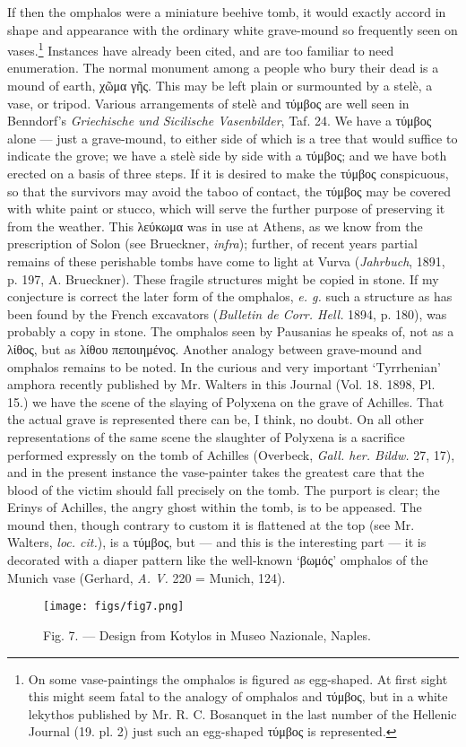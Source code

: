 \documentclass[a4paper, 11pt, oneside, polutonikogreek, english]{article}
\begin{document}
If then the omphalos were a miniature beehive tomb, it would exactly accord in shape and appearance with the ordinary white grave-mound so frequently seen on vases.\footnote{On some vase-paintings the omphalos is figured as egg-shaped. At first sight this might seem fatal to the analogy of omphalos and τύμβος, but in a white lekythos published by Mr. R. C. Bosanquet in the last number of the Hellenic Journal (19. pl. 2) just such an egg-shaped τύμβος is represented.} Instances have already been cited, and are too familiar to need enumeration. The normal monument among a people who bury their dead is a mound of earth, χῶμα γῆς. This may be left plain or surmounted by a stelè, a vase, or tripod. Various arrangements of stelè and τύμβος are well seen in Benndorf's \emph{Griechische und Sicilische Vasenbilder}, Taf. 24. We have a τύμβος alone --- just a grave-mound, to either side of which is a tree that would suffice to indicate the grove; we have a stelè side by side with a τύμβος; and we have both erected on a basis of three steps. If it is desired to make the τύμβος conspicuous, so that the survivors may avoid the taboo of contact, the τύμβος may be covered with white paint or stucco, which will serve the further purpose of preserving it from the weather. This λεύκωμα was in use at Athens, as we know from the prescription of Solon (see Brueckner, \emph{infra}); further, of recent years partial remains of these perishable tombs have come to light at Vurva (\emph{Jahrbuch}, 1891, p. 197, A. Brueckner). These fragile structures might be copied in stone. If my conjecture is correct the later form of the omphalos, \emph{e. g.} such a structure as has been found by the French excavators (\emph{Bulletin de Corr. Hell.} 1894, p. 180), was probably a copy in stone. The omphalos seen by Pausanias he speaks of, not as a λίθος, but as λίθου πεποιημένος. Another analogy between grave-mound and omphalos remains to be noted. In the curious and very important `Tyrrhenian' amphora recently published by Mr. Walters in this Journal (Vol. 18. 1898, Pl. 15.) we have the scene of the slaying of Polyxena on the grave of Achilles. That the actual grave is represented there can be, I think, no doubt. On all other representations of the same scene the slaughter of Polyxena is a sacrifice performed expressly on the tomb of Achilles (Overbeck, \emph{Gall. her. Bildw.} 27, 17), and in the present instance the vase-painter takes the greatest care that the blood of the victim should fall precisely on the tomb. The purport is clear; the Erinys of Achilles, the angry ghost within the tomb, is to be appeased. The mound then, though contrary to custom it is flattened at the top (see Mr. Walters, \emph{loc. cit.}), is a τύμβος, but --- and this is the interesting part --- it is decorated with a diaper pattern like the well-known `βωμός' omphalos of the Munich vase (Gerhard, \emph{A. V.} 220 = Munich, 124).
\begin{figure}[H]
\centering
\texttt{[image: figs/fig7.png]}
\caption{\Fontauri Fig. 7. --- Design from Kotylos in Museo Nazionale, Naples.}
\end{figure}
\end{document}
